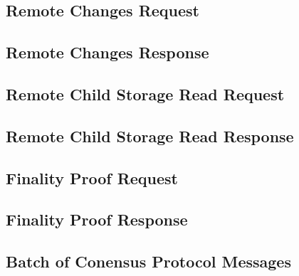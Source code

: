 \documentclass{book}
\begin{document}
\subsection{Remote Changes Request}

\subsection{Remote Changes Response}

\subsection{Remote Child Storage Read Request}

\subsection{Remote Child Storage Read Response}

\subsection{Finality Proof Request}

\subsection{Finality Proof Response}

\subsection{Batch of Conensus Protocol Messages}
\end{document}
